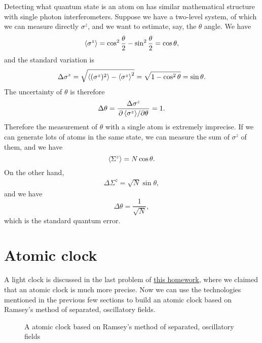 \documentclass[hyperref, a4paper]{article}
\begin{document}
Detecting what quantum state is an atom on has similar mathematical structure with single photon interferometers.
Suppose we have a two-level system, of which we can measure directly $\sigma^z$, and we want to estimate, say, the $\theta$ angle.
We have
\begin{equation}
    \expval{\sigma^z} = \cos^2 \frac{\theta}{2} - \sin^2 \frac{\theta}{2} = \cos \theta,
\end{equation}
and the standard variation is 
\begin{equation}
    \Delta \sigma^z = \sqrt{\expval{(\sigma^z)^2} - \expval{\sigma^z}^2} = \sqrt{1 - \cos^2 \theta} = \sin \theta.
\end{equation}
The uncertainty of $\theta$ is therefore 
\begin{equation}
    \Delta\theta = \frac{\Delta \sigma^z}{\pdv*{\expval{\sigma^z}}{\theta}} = 1.
\end{equation}
Therefore the measurement of $\theta$ with a single atom is extremely imprecise.
If we can generate lots of atoms in the same state, we can measure the sum of $\sigma^z$ of them, and we have 
\begin{equation}
    \expval{\Sigma^z} = N \cos \theta.
\end{equation}
On the other hand, 
\begin{eqnarray}
    \Delta \Sigma^z = \sqrt{N} \sin \theta,
\end{eqnarray}
and we have 
\begin{equation}
    \Delta \theta = \frac{1}{\sqrt{N}},
\end{equation}
which is the standard quantum error.

\section{Atomic clock}

A light clock is discussed in the last problem of \href{quantum-optics-homework/3/3-discussion.pdf}{this homework},
where we claimed that an atomic clock is much more precise. Now we can use the technologies mentioned in the 
previous few sections to build an atomic clock based on Ramsey’s method of separated, oscillatory fields. 

\begin{figure}
    \centering
    
    \caption{A atomic clock based on Ramsey's method of separated, oscillatory fields}
    \label{fig:clock}
\end{figure}
\end{document}
